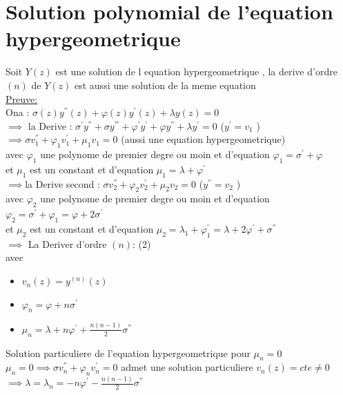 \documentclass[12pt]{book}
\begin{document}
        \section{Solution polynomial de l'equation hypergeometrique}
            Soit $Y(z)$ est une solution de l equation hypergeometrique , la derive d'ordre $ (n) $ de $ Y(z) $ est aussi une solution de la meme equation  \\
            \underline{Preuve:} \\
            Ona : $ \sigma(z)y^{''}(z) + \varphi(z)y^{'}(z) + \lambda y(z) =0 $\\
            $ \implies$ la Derive : $\sigma^{'}y^{''} + \sigma y^{'''} + \varphi^{'}y^{'}+\varphi y^{''} + \lambda y^{'} =0$ ($ y^{'} = v_1 $ )\\
            $ \implies \sigma v_1^{''} + \varphi_1 v_1^{'} + \mu_1v_1 =0 $ (aussi une equation hypergeometrique)  \\
            avec $ \varphi_1 $ une polynome de premier degre ou moin et d'equation $\varphi_1  = \sigma^{'} + \varphi $ \\
            et $\mu_1 $ est un constant et d'equation  $ \mu_1 =\lambda +\varphi^{'}$ \\
            $ \implies $la Derive second : $\sigma v_2^{''} + \varphi_2v_2^{'}+\mu_2v_2 =0 $ ($ y^{''} = v_2 $ ) \\
            avec $ \varphi_2 $ une polynome de premier degre ou moin et d'equation $\varphi_2  = \sigma^{'} + \varphi_1  = \varphi +2\sigma^{'}$ \\
            et $\mu_2 $ est un constant et d'equation  $ \mu_2 =\lambda_1 +\varphi_1^{'} = \lambda + 2 \varphi^{'} + \sigma^{''}$ \\
            $\implies $ La Deriver d'ordre $(n)$:  (2) \\
            avec \begin{itemize}
                \item $ v_n(z)=y^{(n)}(z) $
                \item $ \varphi_n = \varphi + n\sigma^{'} $
                \item $ \mu_n = \lambda + n\varphi^{'} +\frac{n(n-1)}{2}\sigma^{''} $
            \end{itemize}
            Solution particuliere de l'equation hypergeometrique pour $ \mu_n =0 $ \\
            $ \mu_n =0 \implies \sigma v_n^{''} + \varphi_nv_n^{'} =0 $ admet une solution particuliere $ v_n(z) =cte \not = 0 $ \\
            $ \implies \lambda = \lambda_n = - n\varphi^{'} - \frac{n(n-1)}{2}\sigma^{''} $
\end{document}
